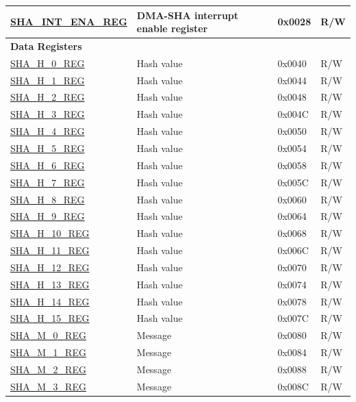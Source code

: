 \begin{longtable}{ | l | l | l |l | }
\hyperref[regdesc:SHAINTENAREG]{SHA\_INT\_ENA\_REG} & DMA-SHA interrupt enable register & 0x0028 & R/W \\ \hline
\multicolumn{4}{|l|}{\textbf{Data Registers}} \\ \hline
\hyperref[regdesc:SHAHNREG]{SHA\_H\_0\_REG} & Hash value & 0x0040 & R/W \\ \hline
\hyperref[regdesc:SHAHNREG]{SHA\_H\_1\_REG} & Hash value & 0x0044 & R/W \\ \hline
\hyperref[regdesc:SHAHNREG]{SHA\_H\_2\_REG} & Hash value & 0x0048 & R/W \\ \hline
\hyperref[regdesc:SHAHNREG]{SHA\_H\_3\_REG} & Hash value & 0x004C & R/W \\ \hline
\hyperref[regdesc:SHAHNREG]{SHA\_H\_4\_REG} & Hash value & 0x0050 & R/W \\ \hline
\hyperref[regdesc:SHAHNREG]{SHA\_H\_5\_REG} & Hash value & 0x0054 & R/W \\ \hline
\hyperref[regdesc:SHAHNREG]{SHA\_H\_6\_REG} & Hash value & 0x0058 & R/W \\ \hline
\hyperref[regdesc:SHAHNREG]{SHA\_H\_7\_REG} & Hash value & 0x005C & R/W \\ \hline
\hyperref[regdesc:SHAHNREG]{SHA\_H\_8\_REG} & Hash value & 0x0060 & R/W \\ \hline
\hyperref[regdesc:SHAHNREG]{SHA\_H\_9\_REG} & Hash value & 0x0064 & R/W \\ \hline
\hyperref[regdesc:SHAHNREG]{SHA\_H\_10\_REG} & Hash value & 0x0068 & R/W \\ \hline
\hyperref[regdesc:SHAHNREG]{SHA\_H\_11\_REG} & Hash value & 0x006C & R/W \\ \hline
\hyperref[regdesc:SHAHNREG]{SHA\_H\_12\_REG} & Hash value & 0x0070 & R/W \\ \hline
\hyperref[regdesc:SHAHNREG]{SHA\_H\_13\_REG} & Hash value & 0x0074 & R/W \\ \hline
\hyperref[regdesc:SHAHNREG]{SHA\_H\_14\_REG} & Hash value & 0x0078 & R/W \\ \hline
\hyperref[regdesc:SHAHNREG]{SHA\_H\_15\_REG} & Hash value & 0x007C & R/W \\ \hline
\hyperref[regdesc:SHAMNREG]{SHA\_M\_0\_REG} & Message & 0x0080 & R/W \\ \hline
\hyperref[regdesc:SHAMNREG]{SHA\_M\_1\_REG} & Message & 0x0084 & R/W \\ \hline
\hyperref[regdesc:SHAMNREG]{SHA\_M\_2\_REG} & Message & 0x0088 & R/W \\ \hline
\hyperref[regdesc:SHAMNREG]{SHA\_M\_3\_REG} & Message & 0x008C & R/W \\ \hline

\end{longtable}
